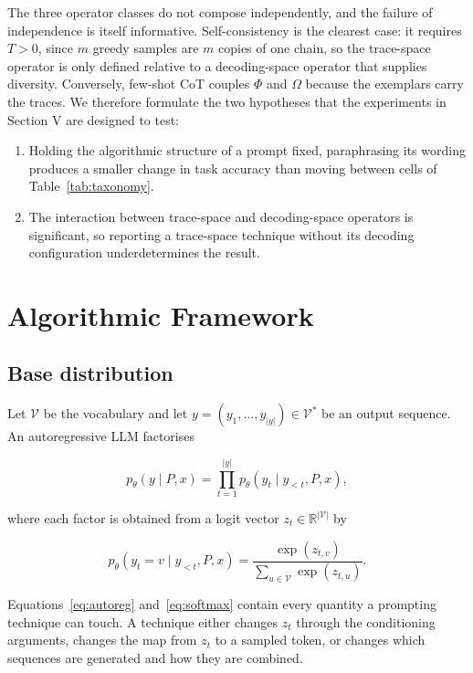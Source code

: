 \documentclass[conference]{IEEEtran}
\begin{document}
The three operator classes do not compose independently, and the failure of independence is itself informative. Self-consistency is the clearest case: it requires $T > 0$, since $m$ greedy samples are $m$ copies of one chain, so the trace-space operator is only defined relative to a decoding-space operator that supplies diversity. Conversely, few-shot CoT couples $\Phi$ and $\Omega$ because the exemplars carry the traces. We therefore formulate the two hypotheses that the experiments in Section V are designed to test:

\begin{enumerate}
    \item[H1] Holding the algorithmic structure of a prompt fixed, paraphrasing its wording produces a smaller change in task accuracy than moving between cells of Table~\ref{tab:taxonomy}.
    \item[H2] The interaction between trace-space and decoding-space operators is significant, so reporting a trace-space technique without its decoding configuration underdetermines the result.
\end{enumerate}

\section{Algorithmic Framework}
\label{sec:framework}

\subsection{Base distribution}
\label{sec:base-dist}

Let $\mathcal{V}$ be the vocabulary and let $y = (y_1, \ldots, y_{|y|}) \in \mathcal{V}^*$ be an output sequence. An autoregressive LLM factorises

\begin{equation}
p_\theta(y \mid P, x) = \prod_{t=1}^{|y|} p_\theta(y_t \mid y_{<t}, P, x),
\label{eq:autoreg}
\end{equation}

where each factor is obtained from a logit vector $z_t \in \mathbb{R}^{|\mathcal{V}|}$ by

\begin{equation}
p_\theta(y_t = v \mid y_{<t}, P, x) = \frac{\exp(z_{t,v})}{\sum_{u \in \mathcal{V}} \exp(z_{t,u})}.
\label{eq:softmax}
\end{equation}

Equations~\eqref{eq:autoreg} and~\eqref{eq:softmax} contain every quantity a prompting technique can touch. A technique either changes $z_{t}$ through the conditioning arguments, changes the map from $z_{t}$ to a sampled token, or changes which sequences are generated and how they are combined.
\end{document}
